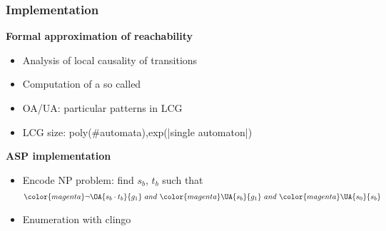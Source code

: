 \begin{frame}[c]
\frametitle{Implementation}
\textbf{Formal approximation of reachability}
\begin{itemize}
\item Analysis of local causality of transitions
\item Computation of a so called 
\item OA/UA: particular patterns in LCG
\item LCG size: poly(\#automata),exp(|single automaton|)
\end{itemize}
\bigskip
\textbf{ASP implementation}
\begin{itemize}
\item Encode NP problem: find $s_b$, $t_b$ such that
\begin{align*}
{\color{magenta} \neg \OA{s_b \cdot t_b}{g_1}} \ and\ {\color{magenta}\UA{s_b}{g_1}}\ and \  {\color{magenta}\UA{s_0}{s_b}}
\end{align*}
\item Enumeration with clingo
\end{itemize}
\end{frame}



